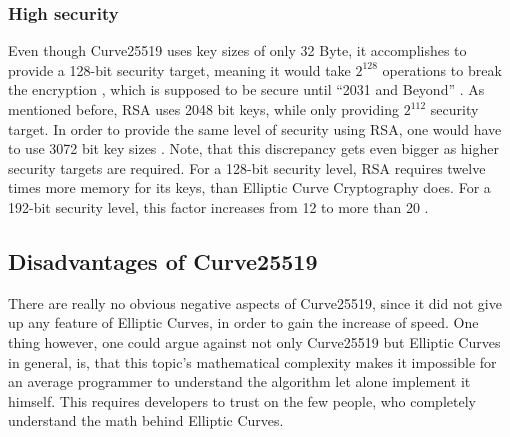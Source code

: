 \subsubsection{High security}
Even though Curve25519 uses key sizes of only 32 Byte, it accomplishes to provide a 128-bit security target, meaning it would take $ 2^{128} $ operations to break the encryption \cite{SecLevel}, which is supposed to be secure until “2031 and Beyond” \cite{KeySize}. As mentioned before, RSA uses 2048 bit keys, while only providing $ 2^{112} $ security target. In order to provide the same level of security using RSA, one would have to use 3072 bit key sizes \cite{KeySize}. Note, that this discrepancy gets even bigger as higher security targets are required. For a 128-bit security level, RSA requires twelve times more memory for its keys, than Elliptic Curve Cryptography does. For a 192-bit security level, this factor increases from 12 to more than 20 \cite{SecLevelInc}.

\subsection{Disadvantages of Curve25519}
There are really no obvious negative aspects of Curve25519, since it did not give up any feature of Elliptic Curves, in order to gain the increase of speed. One thing however, one could argue against not only Curve25519 but Elliptic Curves in general, is, that this topic's mathematical complexity makes it impossible for an average programmer to understand the algorithm let alone implement it himself. This requires developers to trust on the few people, who completely understand the math behind Elliptic Curves.
